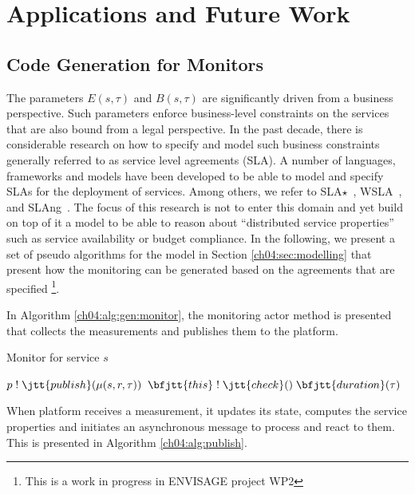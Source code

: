
\section{Applications and Future Work} %
\label{ch04:sec:application}

\subsection{Code Generation for Monitors}

The parameters $E(s,\tau)$ and $B(s,\tau)$ are significantly driven from a business perspective.
Such parameters enforce business-level constraints on the services that are also bound from a legal perspective.
In the past decade, there is considerable research on how to specify and model such business constraints generally referred to as service level agreements (SLA).
A number of languages, frameworks and models have been developed to be able to model and specify SLAs for the deployment of services.
Among others, we refer to SLA$\star$~\cite{kearney2010sla}, WSLA~\cite{keller2003wsla}, and SLAng~\cite{lamanna2003slang}.
The focus of this research is not to enter this domain and yet build on top of it a model to be able to reason about ``distributed service properties'' such as service availability or budget compliance. 
In the following, we present a set of pseudo algorithms for the model in Section \ref{ch04:sec:modelling} that present how the monitoring can be generated based on the agreements that are specified
\footnote{This is a work in progress in ENVISAGE project WP2}. 

In Algorithm \ref{ch04:alg:gen:monitor}, the monitoring actor method  is presented that collects the measurements and publishes them to the platform.

% 
\begin{algorithm}
\caption{Monitor for service $s$}
\label{ch04:alg:gen:monitor}
\begin{algorithmic}
    \State $p \; ! \; \jtt{publish}(\mu(s,r,\tau))$
    \State $\bfjtt{this} \; ! \; \jtt{check}() \; \bfjtt{duration}(\tau)$
  \EndFor
\EndFunction
\end{algorithmic}
\end{algorithm}
% 

When platform receives a measurement, it updates its state, computes the service properties and initiates an asynchronous message to process and react to them.
This is presented in Algorithm \ref{ch04:alg:publish}.

